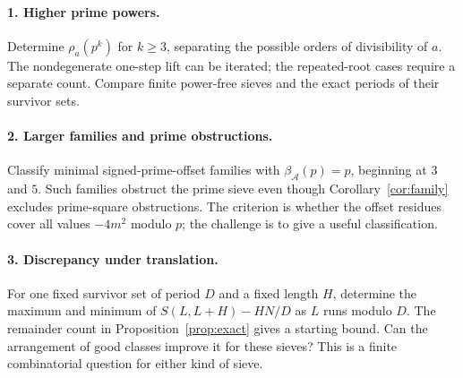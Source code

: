 \documentclass[11pt]{article}
\theoremstyle{definition}
\theoremstyle{remark}
\begin{document}
\paragraph{1. Higher prime powers.}
Determine $\rho_a(p^k)$ for $k\ge3$, separating the possible orders
of divisibility of $a$. The nondegenerate one-step lift can be iterated;
the repeated-root cases require a separate count. Compare finite
power-free sieves and the exact periods of their survivor sets.

\paragraph{2. Larger families and prime obstructions.}
Classify minimal signed-prime-offset families with
$\beta_{\mathcal A}(p)=p$, beginning at $3$ and $5$.
Such families obstruct the prime sieve even though
Corollary~\ref{cor:family} excludes prime-square obstructions.
The criterion is whether the offset residues cover all values
$-4m^2$ modulo $p$; the challenge is to give a useful classification.

\paragraph{3. Discrepancy under translation.}
For one fixed survivor set of period $D$ and a fixed length $H$,
determine the maximum and minimum of $S(L,L+H)-HN/D$ as
$L$ runs modulo $D$. The remainder count in
Proposition~\ref{prop:exact} gives a starting bound.
Can the arrangement of good classes improve it for these sieves?
This is a finite combinatorial question for either kind of sieve.
\end{document}
